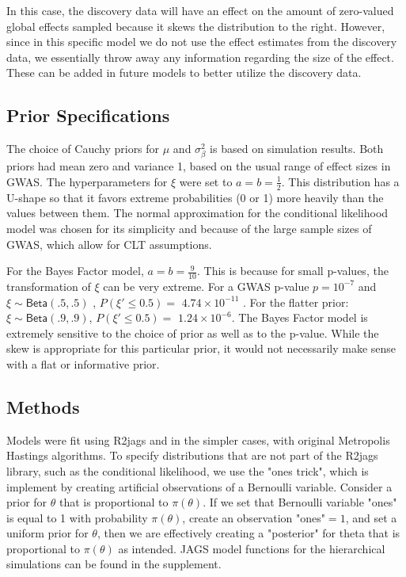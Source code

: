 \documentclass[AMA,STIX1COL]{WileyNJD-v2}\usepackage[]{graphicx}\usepackage[]{color}
\begin{document}
In this case, the discovery data will have an effect on the amount of zero-valued global effects sampled because it skews the distribution to the right. However, since in this specific model we do not use the effect estimates from the discovery data, we essentially throw away any information regarding the size of the effect. These can be added in future models to better utilize the discovery data.


\subsection{Prior Specifications}


The choice of Cauchy priors for $\mu$ and $\sigma^2_{\beta}$ is based on simulation results. Both priors had mean zero and variance 1, based on the usual range of effect sizes in GWAS. The hyperparameters for $\xi$ were set to $a = b= \frac{1}{2}$. This distribution has a U-shape so that it favors extreme probabilities (0 or 1) more heavily than the values between them.  The normal approximation for the conditional likelihood model was chosen for its simplicity and because of the large sample sizes of GWAS, which allow for CLT assumptions.

For the Bayes Factor model, $a = b= \frac{9}{10}$. This is because for small p-values, the transformation of $\xi$ can be very extreme. For a GWAS p-value $p = 10^{-7}$ and $\xi \sim \textsf{Beta}(.5,.5)$ , $P( \xi' \leq 0.5) =$  $\ensuremath{4.74\times 10^{-11}}$ . For the flatter prior: $\xi \sim \textsf{Beta}(.9,.9)$, $P( \xi' \leq 0.5) =$ $\ensuremath{1.24\times 10^{-6}}$. The Bayes Factor model is extremely sensitive to the choice of prior as well as to the p-value. While the skew is appropriate for this particular prior, it would not necessarily make sense with a flat or informative prior.

\subsection{Methods}

Models were fit using R2jags and in the simpler cases, with original Metropolis Hastings algorithms. To specify distributions that are not part of the R2jags library, such as the conditional likelihood, we use the "ones trick", which is implement by creating artificial observations of a Bernoulli variable. Consider a prior for $\theta$ that is proportional to $\pi(\theta)$. If we set that Bernoulli variable "ones" is equal to 1 with probability $\pi(\theta)$, create an observation "ones"$= 1$, and set a uniform prior for $\theta$, then we are effectively creating a "posterior" for theta that is proportional to  $\pi(\theta)$ as intended. JAGS model functions for the hierarchical simulations can be found in the supplement.
\end{document}
